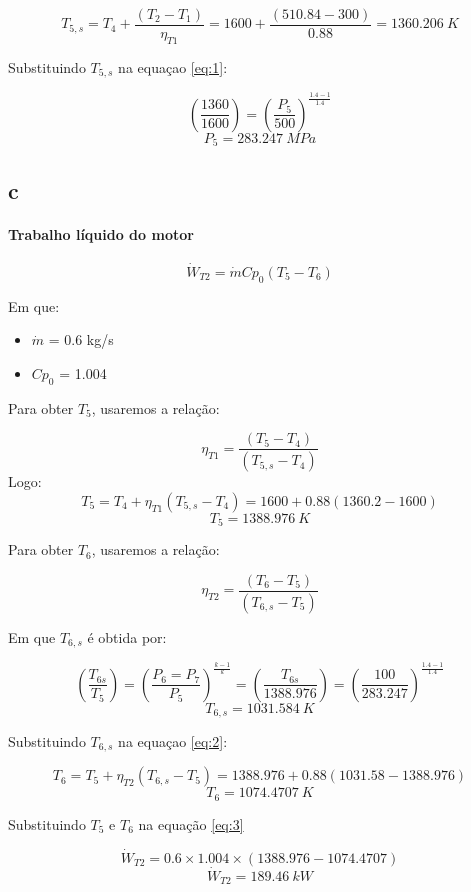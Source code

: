 \documentclass[a4paper, 12pt]{article}
\begin{document}
\[T_{5,s} = T_{4} + \frac{(T_{2}-T_{1})}{ \eta _{T1} } = 1600 + \frac{(510.84-300)}{ 0.88 } = 1360.206 \ K \]

Substituindo $T_{5,s}$ na equaçao \ref{eq:1}:

\[\left( \frac{1360}{1600}   \right) = \left( \frac{P_{5}}{500} \right)^{\frac{1.4-1}{1.4}} \]
\[P_{5} = 283.247 \ MPa\]

\subsection{c}
\paragraph*{Trabalho líquido do motor}

\begin{equation}
\dot{W}_{T2} = \dot{m}Cp_{0}(T_{5}-T_{6})
\label{eq:3}
\end{equation}

Em que:
\begin{itemize}
\item $\dot{m}$ = 0.6 kg/s
\item $Cp_{0}$ = 1.004
\end{itemize}

Para obter $T_{5}$, usaremos a relação:

\[\eta _{T1} = \frac{(T_{5}-T_{4})}{(T_{5,s}-T_{4})}\]
Logo:
\[ T_{5}  = T_{4} + \eta _{T1}(T_{5,s}-T_{4}) = 1600 + 0.88(1360.2-1600)\]
\[T_{5} = 1388.976 \ K\]

Para obter $T_{6}$, usaremos a relação:

\begin{equation}
\eta _{T2} = \frac{(T_{6}-T_{5})}{(T_{6,s}-T_{5})}
\label{eq:2}
\end{equation}

Em que $T_{6,s}$ é obtida por:

\[\left( \frac{T_{6s}}{T_{5}}   \right) = \left( \frac{P_{6} = P_{7}}{P_{5}} \right)^{\frac{k-1}{k}} = \left( \frac{T_{6s}}{1388.976}   \right) = \left( \frac{100}{283.247} \right)^{\frac{1.4-1}{1.4}} \]
\[T_{6,s} = 1031.584 \ K\]

Substituindo $T_{6,s}$ na equaçao \ref{eq:2}:

\[ T_{6}  = T_{5} + \eta _{T2}(T_{6,s}-T_{5}) = 1388.976 + 0.88(1031.58-1388.976)\]
\[T_{6} = 1074.4707 \ K\]

Substituindo $T_{5}$ e $T_{6}$ na equação \ref{eq:3}

\[\dot{W}_{T2} = 0.6 \times 1.004 \times (1388.976 -1074.4707)\]
\[\dot{W}_{T2} = 189.46 \ kW\]
\end{document}
